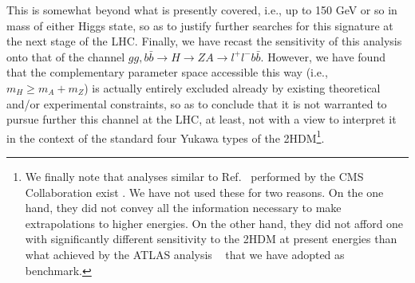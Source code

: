 This is somewhat beyond what is presently covered, i.e.,  up to 150 GeV or so in mass of either Higgs state, so as to justify further searches for this signature at the next stage of the LHC. Finally, we have recast the sensitivity of this analysis onto that of the channel  $gg,b\bar b\to H\to ZA\to l^+l^-b\bar b$. However, we have found that the complementary parameter space accessible this way (i.e., $m_H\ge  m_A+m_Z$) is actually entirely excluded already by existing theoretical and/or experimental constraints, so as to conclude that it is not warranted to pursue further this channel at the LHC, at least, not with a view to interpret it in the context of the standard four Yukawa types of the 2HDM\footnote{We finally note that analyses similar to Ref.~\cite{Aaboud2018AZHbbll}
performed by the CMS Collaboration exist \cite{Khachatryan2016resonancesbbtautau,Sirunyan2020newneutral}. We have not used these for two reasons. On the one hand, they did not convey all the  information necessary to make  extrapolations to higher energies. On the other hand, they did not afford one with significantly different sensitivity to the 2HDM at present energies than what achieved by the ATLAS analysis ~\cite{Aaboud2018AZHbbll} that we have adopted as benchmark.}.

